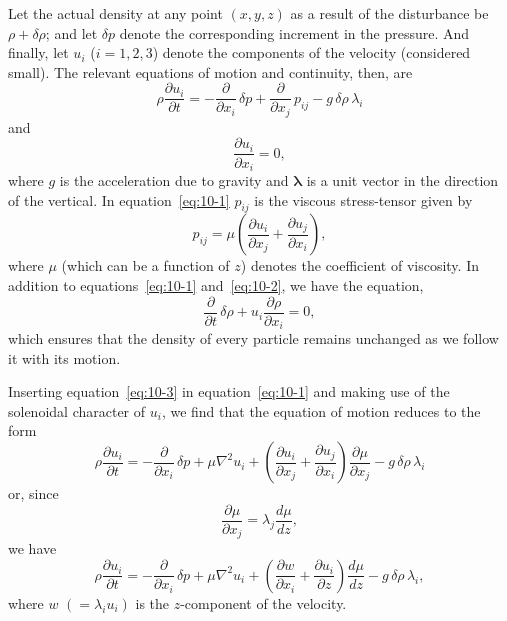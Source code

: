 Let the actual density at any point $(x,y,z)$ as a result of the disturbance be $\rho+\delta\rho$; and let $\delta p$ denote the corresponding increment in the pressure. And finally, let $u_i$ ($i=1,2,3$) denote the components of the velocity (considered small). The relevant equations of motion and continuity, then, are
\begin{equation}
\label{eq:10-1}
\rho\frac{\partial u_i}{\partial t} = -\frac{\partial}{\partial x_i}\,\delta p + \frac{\partial}{\partial x_j}\,p_{ij} - g\,\delta\rho\,\lambda_i
\end{equation}
and
\begin{equation}
\label{eq:10-2}
\frac{\partial u_i}{\partial x_i} = 0,
\end{equation}
where $g$ is the acceleration due to gravity and $\boldsymbol{\lambda}$ is a unit vector in the direction of the vertical. In equation~\eqref{eq:10-1} $p_{ij}$ is the viscous stress-tensor given by
\begin{equation}
\label{eq:10-3}
p_{ij} = \mu\!\left(\frac{\partial u_i}{\partial x_j}+\frac{\partial u_j}{\partial x_i}\right)\!,
\end{equation}
where $\mu$ (which can be a function of $z$) denotes the coefficient of viscosity. In addition to equations~\eqref{eq:10-1} and~\eqref{eq:10-2}, we have the equation,
\begin{equation}
\label{eq:10-4}
\frac{\partial}{\partial t}\,\delta\rho + u_i\frac{\partial\rho}{\partial x_i} = 0,
\end{equation}
which ensures that the density of every particle remains unchanged as we follow it with its motion.

Inserting equation~\eqref{eq:10-3} in equation~\eqref{eq:10-1} and making use of the solenoidal character of $u_i$, we find that the equation of motion reduces to the form
\begin{equation}
\label{eq:10-5}
\rho\frac{\partial u_i}{\partial t} = -\frac{\partial}{\partial x_i}\,\delta p + \mu\nabla^2 u_i + \left(\frac{\partial u_i}{\partial x_j}+\frac{\partial u_j}{\partial x_i}\right)\frac{\partial\mu}{\partial x_j} - g\,\delta\rho\,\lambda_i
\end{equation}
or, since
\begin{equation}
\label{eq:10-6}
\frac{\partial\mu}{\partial x_j} = \lambda_j\frac{d\mu}{dz},
\end{equation}
we have
\begin{equation}
\label{eq:10-7}
\rho\frac{\partial u_i}{\partial t} = -\frac{\partial}{\partial x_i}\,\delta p + \mu\nabla^2 u_i + \left(\frac{\partial w}{\partial x_i}+\frac{\partial u_i}{\partial z}\right)\frac{d\mu}{dz} - g\,\delta\rho\,\lambda_i,
\end{equation}
where $w$ $(= \lambda_i u_i)$ is the $z$-component of the velocity.

